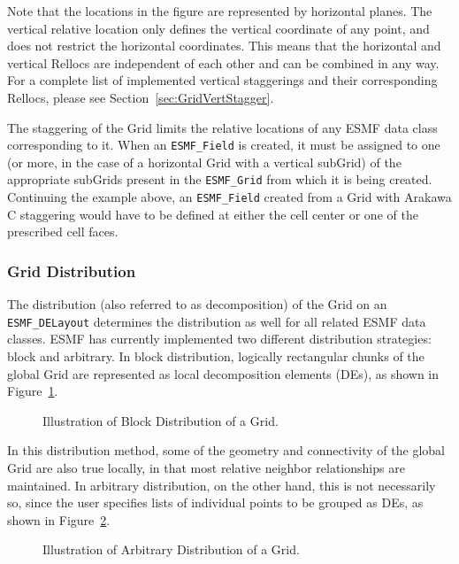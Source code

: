 Note that the locations in the figure are represented by horizontal planes.  The
vertical relative location only defines the vertical coordinate of any point, and
does not restrict the horizontal coordinates.  This means that the horizontal and
vertical Rellocs are independent of each other and can be combined in any way.
For a complete list of implemented vertical staggerings and their corresponding
Rellocs, please see Section~\ref{sec:GridVertStagger}.

The staggering of the Grid limits the relative locations of any ESMF data 
class corresponding to it.  When an {\tt ESMF\_Field} is created, it must be
assigned to one (or more, in the case of a horizontal Grid with a vertical
subGrid) of the appropriate subGrids present in the {\tt ESMF\_Grid} from
which it is being created.  Continuing the example above, an {\tt ESMF\_Field}
created from a Grid with Arakawa C staggering would have to be defined at either the cell center or one of the prescribed cell faces. 


\subsubsection{Grid Distribution}

The distribution (also referred to as decomposition) of the Grid on an
{\tt ESMF\_DELayout} determines the distribution as well for all related
ESMF data classes.  ESMF has currently implemented two different distribution
strategies: block and arbitrary.  In block distribution, logically rectangular
chunks of the global Grid are represented as local decomposition elements
(DEs), as shown in Figure~\ref{fig:GridBlockDistribute}.

\begin{center}
\begin{figure}
\caption{Illustration of Block Distribution of a Grid. }
\label{fig:GridBlockDistribute}
\end{figure}
\end{center}

In this distribution method, some of the geometry and connectivity of the global
Grid are also true locally, in that most relative neighbor relationships are
maintained.  In arbitrary distribution, on the other hand, this is not
necessarily so, since the user specifies lists of individual points to
be grouped as DEs, as shown in Figure~\ref{fig:GridArbitraryDistribute}.

\begin{center}
\begin{figure}
\caption{Illustration of Arbitrary Distribution of a Grid. }
\label{fig:GridArbitraryDistribute}
\end{figure}
\end{center}

